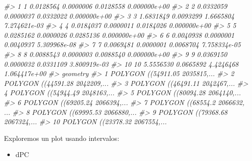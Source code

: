\documentclass[
]{book}
\newenvironment{Shaded}{\begin{snugshade}}{\end{snugshade}}
\newcommand{\CommentTok}[1]{\textcolor[rgb]{0.56,0.35,0.01}{\textit{#1}}}
\providecommand{\tightlist}{%
  \setlength{\itemsep}{0pt}\setlength{\parskip}{0pt}}
\begin{document}
\begin{Shaded}
\begin{Highlighting}[]
\CommentTok{\#\textgreater{} 1   1 0.0128564 0.0000006 0.0128558 0.000000e+00}
\CommentTok{\#\textgreater{} 2   2 0.0332059 0.0000037 0.0332022 0.000000e+00}
\CommentTok{\#\textgreater{} 3   3 1.6831849 0.0093299 1.6665804 7.274621e{-}03}
\CommentTok{\#\textgreater{} 4   4 0.0184037 0.0000011 0.0184026 0.000000e+00}
\CommentTok{\#\textgreater{} 5   5 0.0285162 0.0000026 0.0285136 0.000000e+00}
\CommentTok{\#\textgreater{} 6   6 0.0040938 0.0000001 0.0040937 5.309968e{-}08}
\CommentTok{\#\textgreater{} 7   7 0.0069481 0.0000001 0.0068704 7.758334e{-}05}
\CommentTok{\#\textgreater{} 8   8 0.0088543 0.0000003 0.0088540 0.000000e+00}
\CommentTok{\#\textgreater{} 9   9 0.0369150 0.0000032 0.0331109 3.800919e{-}03}
\CommentTok{\#\textgreater{} 10 10 5.5556530 0.0665892 4.4246468 1.064417e+00}
\CommentTok{\#\textgreater{}                          geometry}
\CommentTok{\#\textgreater{} 1  POLYGON ((54911.05 2035815,...}
\CommentTok{\#\textgreater{} 2  POLYGON ((44591.28 2042209,...}
\CommentTok{\#\textgreater{} 3  POLYGON ((46491.11 2042467,...}
\CommentTok{\#\textgreater{} 4  POLYGON ((54944.49 2048163,...}
\CommentTok{\#\textgreater{} 5  POLYGON ((80094.28 2064140,...}
\CommentTok{\#\textgreater{} 6  POLYGON ((69205.24 2066394,...}
\CommentTok{\#\textgreater{} 7  POLYGON ((68554.2 2066632, ...}
\CommentTok{\#\textgreater{} 8  POLYGON ((69995.53 2066880,...}
\CommentTok{\#\textgreater{} 9  POLYGON ((79368.68 2067324,...}
\CommentTok{\#\textgreater{} 10 POLYGON ((23378.32 2067554,...}
\end{Highlighting}
\end{Shaded}

Exploremos un plot usando intervalos:

\begin{itemize}
\tightlist
\item
  dPC
\end{itemize}
\end{document}
